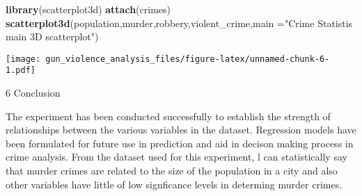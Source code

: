 \documentclass[]{article}
\newenvironment{Shaded}{\begin{snugshade}}{\end{snugshade}}
\newcommand{\KeywordTok}[1]{\textcolor[rgb]{0.13,0.29,0.53}{\textbf{#1}}}
\newcommand{\DataTypeTok}[1]{\textcolor[rgb]{0.13,0.29,0.53}{#1}}
\newcommand{\StringTok}[1]{\textcolor[rgb]{0.31,0.60,0.02}{#1}}
\newcommand{\NormalTok}[1]{#1}
\begin{document}
\begin{Shaded}
\begin{Highlighting}[]
\KeywordTok{library}\NormalTok{(scatterplot3d)}
\KeywordTok{attach}\NormalTok{(crimes)}
\KeywordTok{scatterplot3d}\NormalTok{(population,murder,robbery,violent_crime,}\DataTypeTok{main =}\StringTok{"Crime Statistis main 3D scatterplot"}\NormalTok{)}
\end{Highlighting}
\end{Shaded}

\texttt{[image: gun\_violence\_analysis\_files/figure-latex/unnamed-chunk-6-1.pdf]}

6 Conclusion

The experiment has been conducted successfully to establish the strength
of relationships between the various variables in the dataset.
Regression models have been formulated for future use in prediction and
aid in decison making process in crime analysis. From the dataset used
for this experiment, l can statistically say that murder crimes are
related to the size of the population in a city and also other variables
have little of low signficance levels in determing murder crimes.
\end{document}
